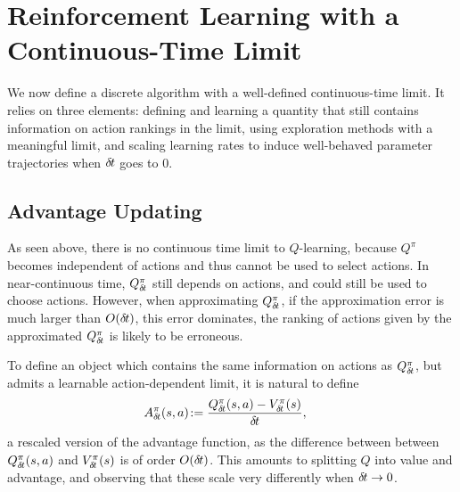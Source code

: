 \section{Reinforcement Learning with a Continuous-Time Limit}

We now define a discrete algorithm with a well-defined continuous-time
limit.  It relies on three elements: defining and learning a quantity
that still contains information on action rankings in the limit, using
exploration methods with a meaningful limit, and scaling learning rates
to induce well-behaved parameter trajectories when ${\delta\hspace{-.1em}t}$ goes to $0$.


\subsection{Advantage Updating}
\label{subsec:reparam}

As seen above, there is no continuous time limit to $Q$-learning, because
$Q^\pi$ becomes independent of actions and thus cannot be
used to select actions.  In near-continuous time,
$Q^\pi_{\delta\hspace{-.1em}t}$ still depends on actions, and could still be used to
choose actions. However, when
approximating $Q^\pi_{\delta\hspace{-.1em}t}$, if the approximation error is much larger
than $O({\delta\hspace{-.1em}t})$, this error dominates, the ranking of
actions given by the approximated $Q^\pi_{\delta\hspace{-.1em}t}$ is likely to be erroneous.

To define an object which contains the same information on actions as
$Q^\pi_{\delta\hspace{-.1em}t}$, but admits a learnable action-dependent limit, it is
natural to define \cite{adv_upd}
\begin{align}
	A^\pi_{\delta\hspace{-.1em}t}(s, a) &\colon\hspace{-.6em}= \frac{Q^\pi_{\delta\hspace{-.1em}t}(s,a) - V^\pi_{\delta\hspace{-.1em}t}(s)}{{\delta\hspace{-.1em}t}},
    \label{eq:adv}
\end{align}
a rescaled version of the advantage function, as the difference between between
$Q^\pi_{\delta\hspace{-.1em}t}(s, a)$ and $V^\pi_{\delta\hspace{-.1em}t}(s)$ is of order
$O({\delta\hspace{-.1em}t})$. This amounts to splitting $Q$ into value and advantage,
and observing that these scale very differently when ${\delta\hspace{-.1em}t}\to 0$.

